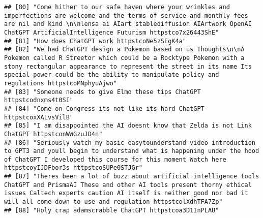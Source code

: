 \documentclass[
]{article}
\begin{document}
\begin{verbatim}
## [80] "Come hither to our safe haven where your wrinkles and imperfections are welcome and the terms of service and monthly fees are nil and kind \n\nlensa ai AIart stablediffusion AIArtwork OpenAI ChatGPT ArtificialIntelligence Futurism httpstco7x26443ShE"                                                         
## [81] "How does ChatGPT work httpstcoNe5zSEgK4a"                                                                                                                                                                                                                                                                          
## [82] "We had ChatGPT design a Pokemon based on us Thoughts\n\nA Pokemon called R Streetor which could be a Rocktype Pokemon with a stony rectangular appearance to represent the street in its name Its special power could be the ability to manipulate policy and regulations httpstcoMNphyuAjwo"                      
## [83] "Someone needs to give Elmo these tips ChatGPT httpstcodnxms4t0SI"                                                                                                                                                                                                                                                  
## [84] "Come on Congress its not like its hard ChatGPT httpstcoxXALvsVilB"                                                                                                                                                                                                                                                 
## [85] "I am disappointed the AI doesnt know that Zelda is not Link ChatGPT httpstconWWGzuJD4n"                                                                                                                                                                                                                            
## [86] "Seriously watch my basic easytounderstand video introduction to GPT3 and youll begin to understand what is happening under the hood of ChatGPT I developed this course for this moment Watch here httpstcoyIJDFbor3s httpstcoSUPe0STJGr"                                                                           
## [87] "Theres been a lot of buzz about artificial intelligence tools ChatGPT and PrismaAI These and other AI tools present thorny ethical issues Caltech experts caution AI itself is neither good nor bad it will all come down to use and regulation httpstcolXdhTFA7Zp"                                                
## [88] "Holy crap adamscrabble ChatGPT httpstcoa3D1InPLAU"                                                                                                                                                                                                                                                                 

\end{verbatim}
\end{document}
